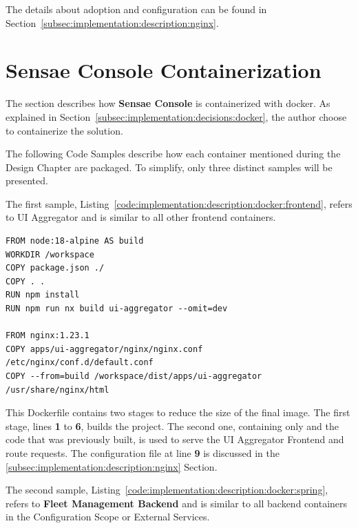 The details about  adoption and configuration can be found in Section~\ref{subsec:implementation:description:nginx}.

\section{Sensae Console Containerization}
\label{subsec:implementation:description:docker}

The section describes how \textbf{Sensae Console} is containerized with docker.
As explained in Section~\ref{subsec:implementation:decisions:docker}, the author choose to containerize the solution.

The following Code Samples describe how each container mentioned during the Design Chapter are packaged. To simplify, only three distinct samples will be presented.

The first sample, Listing~\ref{code:implementation:description:docker:frontend}, refers to UI Aggregator and is similar to all other frontend containers.

\begin{lstlisting}[caption=Dockerfile for UI Aggregator Frontend, label={code:implementation:description:docker:frontend}]
FROM node:18-alpine AS build
WORKDIR /workspace
COPY package.json ./
COPY . .
RUN npm install
RUN npm run nx build ui-aggregator --omit=dev

FROM nginx:1.23.1
COPY apps/ui-aggregator/nginx/nginx.conf /etc/nginx/conf.d/default.conf
COPY --from=build /workspace/dist/apps/ui-aggregator /usr/share/nginx/html
\end{lstlisting}

This Dockerfile contains two stages to reduce the size of the final image. The first stage, lines \textbf{1} to \textbf{6}, builds the project. The second one, containing only  and the code that was previously built, is used to serve the UI Aggregator Frontend and route requests. The  configuration file at line \textbf{9} is discussed in the \ref{subsec:implementation:description:nginx} Section.

The second sample, Listing~\ref{code:implementation:description:docker:spring}, refers to \textbf{Fleet Management Backend} and is similar to all backend containers in the Configuration Scope or External Services.

